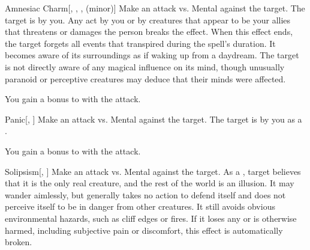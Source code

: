 \lowercase{\hypertarget{spell:Amnesiac Charm}{}}\label{spell:Amnesiac Charm}
\begin{freeability}[Rank 6]{\hypertarget{spell:Amnesiac Charm}{Amnesiac Charm}}[, , ,  (minor)]
Make an attack vs. Mental against the target.
\hit The target is \charmed by you.
Any act by you or by creatures that appear to be your allies that threatens or damages the  person breaks the effect.
When this effect ends, the target forgets all events that transpired during the spell's duration.
It becomes aware of its surroundings as if waking up from a daydream.
The target is not directly aware of any magical influence on its mind, though unusually paranoid or perceptive creatures may deduce that their minds were affected.

\rankline
{} You gain a  bonus to  with the attack.
\end{freeability}
\vspace{0.25em}



\lowercase{\hypertarget{spell:Panic}{}}\label{spell:Panic}
\begin{freeability}[Rank 6]{\hypertarget{spell:Panic}{Panic}}[, ]
Make an attack vs. Mental against the target.
\hit The target is \panicked by you as a .

\rankline
{} You gain a  bonus to  with the attack.
\end{freeability}
\vspace{0.25em}



\lowercase{\hypertarget{spell:Solipsism}{}}\label{spell:Solipsism}
\begin{freeability}[Rank 7]{\hypertarget{spell:Solipsism}{Solipsism}}[, ]
Make an attack vs. Mental against the target.
\hit As a , target believes that it is the only real creature, and the rest of the world is an illusion.
It may wander aimlessly, but generally takes no action to defend itself and does not perceive itself to be in danger from other creatures.
It still avoids obvious environmental hazards, such as cliff edges or fires.
If it loses any  or is otherwise harmed, including subjective pain or discomfort, this effect is automatically broken.
\end{freeability}
\vspace{0.25em}


